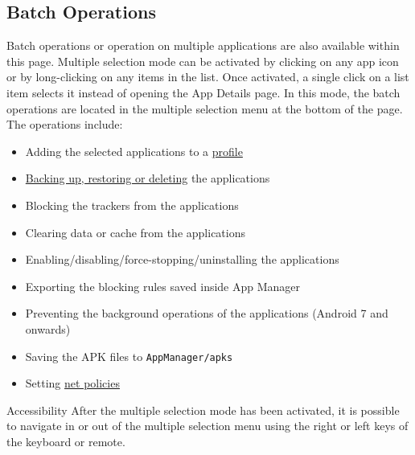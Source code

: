 \subsection{Batch Operations}\label{subsec:batch-operations} %
Batch operations or operation on multiple applications are also available within this page. Multiple selection mode can
be activated by clicking on any app icon or by long-clicking on any items in the list. Once activated, a single click on
a list item selects it instead of opening the App Details page. In this mode, the batch operations are located in the
multiple selection menu at the bottom of the page. The operations include:
\begin{itemize}
    \item Adding the selected applications to a \hyperref[sec:profiles-page]{profile}
    \item \hyperref[sec:backup-restore]{Backing up, restoring or deleting} the applications
    \item Blocking the trackers from the applications
    \item Clearing data or cache from the applications
    \item Enabling/disabling/force-stopping/uninstalling the applications
    \item Exporting the blocking rules saved inside App Manager
    \item Preventing the background operations of the applications (Android 7 and onwards)
    \item Saving the APK files to \texttt{AppManager/apks}
    \item Setting \hyperref[sec:net-policy]{net policies}
\end{itemize}

\begin{tip}{Accessibility}
    After the multiple selection mode has been activated, it is possible to navigate in or out of the multiple selection
    menu using the right or left keys of the keyboard or remote.
\end{tip}

